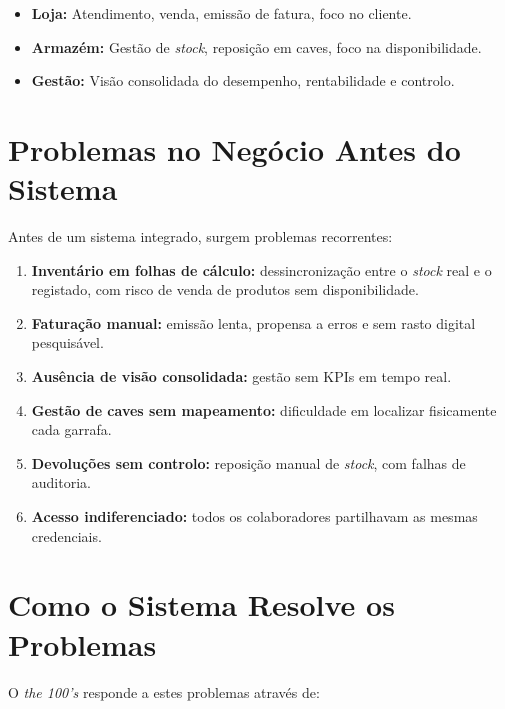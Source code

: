 \documentclass[11pt,a4paper]{report}
\begin{document}
\begin{itemize}
  \item \textbf{Loja:} Atendimento, venda, emissão de fatura, foco no cliente.
  \item \textbf{Armazém:} Gestão de \textit{stock}, reposição em caves, foco na disponibilidade.
  \item \textbf{Gestão:} Visão consolidada do desempenho, rentabilidade e controlo.
\end{itemize}

\section{Problemas no Negócio Antes do Sistema}
Antes de um sistema integrado, surgem problemas recorrentes:

\begin{enumerate}
  \item \textbf{Inventário em folhas de cálculo:} dessincronização entre o \textit{stock} real e o registado, com risco de venda de produtos sem disponibilidade.
  \item \textbf{Faturação manual:} emissão lenta, propensa a erros e sem rasto digital pesquisável.
  \item \textbf{Ausência de visão consolidada:} gestão sem KPIs em tempo real.
  \item \textbf{Gestão de caves sem mapeamento:} dificuldade em localizar fisicamente cada garrafa.
  \item \textbf{Devoluções sem controlo:} reposição manual de \textit{stock}, com falhas de auditoria.
  \item \textbf{Acesso indiferenciado:} todos os colaboradores partilhavam as mesmas credenciais.
\end{enumerate}

\section{Como o Sistema Resolve os Problemas}
O \textit{the 100's} responde a estes problemas através de:
\end{document}
